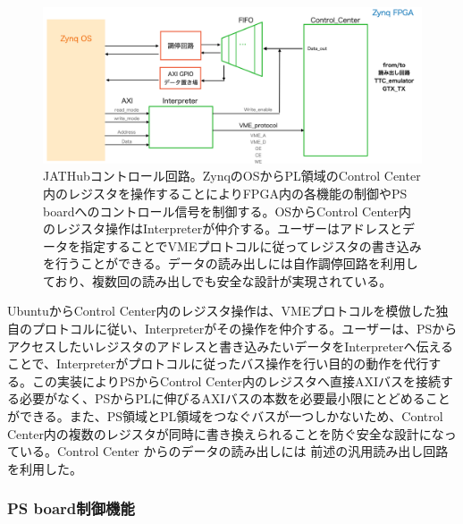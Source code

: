 \begin{figure} 
\centering
\includegraphics[width=16cm]{fig/QAQC/JATHubccenter.png}
\caption[JATHubコントロール回路]{JATHubコントロール回路。ZynqのOSからPL領域のControl Center内のレジスタを操作することによりFPGA内の各機能の制御やPS boardへのコントロール信号を制御する。OSからControl Center内のレジスタ操作はInterpreterが仲介する。ユーザーはアドレスとデータを指定することでVMEプロトコルに従ってレジスタの書き込みを行うことができる。データの読み出しには自作調停回路を利用しており、複数回の読み出しでも安全な設計が実現されている。}
\label{JATHubccenter}
\end{figure}

UbuntuからControl Center内のレジスタ操作は、VMEプロトコルを模倣した独自のプロトコルに従い、Interpreterがその操作を仲介する。ユーザーは、PSからアクセスしたいレジスタのアドレスと書き込みたいデータをInterpreterへ伝えることで、Interpreterがプロトコルに従ったバス操作を行い目的の動作を代行する。この実装によりPSからControl Center内のレジスタへ直接AXIバスを接続する必要がなく、PSからPLに伸びるAXIバスの本数を必要最小限にとどめることができる。また、PS領域とPL領域をつなぐバスが一つしかないため、Control Center内の複数のレジスタが同時に書き換えられることを防ぐ安全な設計になっている。Control Center からのデータの読み出しには 前述の汎用読み出し回路を利用した。

\subsubsection{PS board制御機能}

